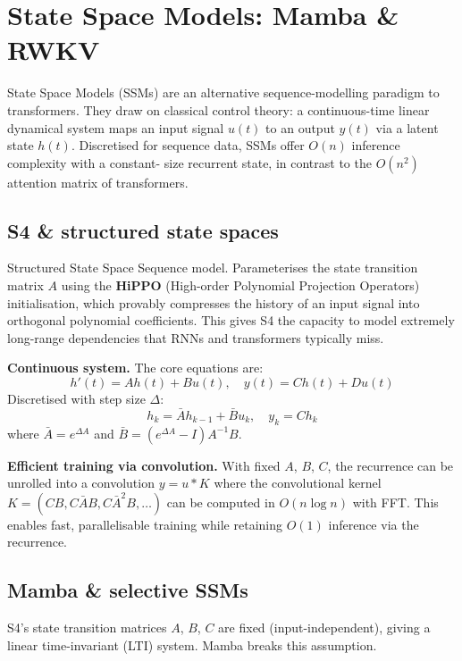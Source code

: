 
\section{State Space Models: Mamba \& RWKV}

State Space Models (SSMs) are an alternative sequence-modelling paradigm to
transformers. They draw on classical control theory: a continuous-time linear dynamical
system maps an input signal $u(t)$ to an output $y(t)$ via a latent state $h(t)$.
Discretised for sequence data, SSMs offer $O(n)$ inference complexity with a constant-
size recurrent state, in contrast to the $O(n^2)$ attention matrix of transformers.

\subsection{S4 \& structured state spaces}

\begin{paperbox}[title={S4 (Gu et al.\ 2022)}]
  Structured State Space Sequence model. Parameterises the state transition matrix $A$
  using the \textbf{HiPPO} (High-order Polynomial Projection Operators) initialisation,
  which provably compresses the history of an input signal into orthogonal polynomial
  coefficients. This gives S4 the capacity to model extremely long-range dependencies
  that RNNs and transformers typically miss.
\end{paperbox}

\textbf{Continuous system.} The core equations are:
\[
  h'(t) = A h(t) + B u(t), \quad y(t) = C h(t) + D u(t)
\]
Discretised with step size $\Delta$:
\[
  h_k = \bar{A} h_{k-1} + \bar{B} u_k, \quad y_k = C h_k
\]
where $\bar{A} = e^{\Delta A}$ and $\bar{B} = (e^{\Delta A} - I) A^{-1} B$.

\textbf{Efficient training via convolution.} With fixed $A$, $B$, $C$, the recurrence
can be unrolled into a convolution $y = u * K$ where the convolutional kernel
$K = (CB, C\bar{A}B, C\bar{A}^2 B, \ldots)$ can be computed in $O(n \log n)$ with FFT.
This enables fast, parallelisable training while retaining $O(1)$ inference via the
recurrence.

\subsection{Mamba \& selective SSMs}

S4's state transition matrices $A$, $B$, $C$ are fixed (input-independent), giving a
linear time-invariant (LTI) system. Mamba breaks this assumption.

